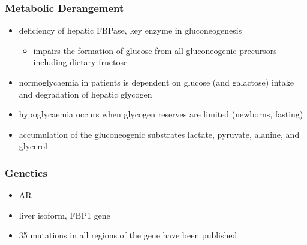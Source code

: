 \documentclass{scrartcl}
\begin{document}
\subsubsection{Metabolic Derangement}
\label{sec:orgb56d066}
\begin{itemize}
\item deficiency of hepatic FBPase, key enzyme in gluconeogenesis
\begin{itemize}
\item impairs the formation of glucose from all gluconeogenic precursors including dietary fructose
\end{itemize}
\item normoglycaemia in patients is dependent on glucose (and galactose)
intake and degradation of hepatic glycogen
\item hypoglycaemia occurs when glycogen reserves are limited (newborns, fasting)
\item accumulation of the gluconeogenic substrates lactate, pyruvate, alanine, and glycerol
\end{itemize}
\subsubsection{Genetics}
\label{sec:org71cb5ab}
\begin{itemize}
\item AR
\item liver isoform, FBP1 gene
\item 35 mutations in all regions of the gene have been published
\end{itemize}
\end{document}
